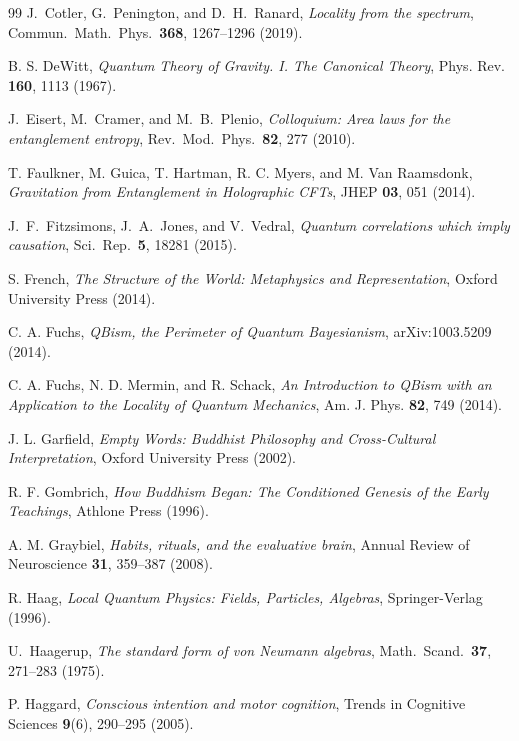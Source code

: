 \documentclass[12pt,a4paper,openany]{book}
\begin{document}
\begin{thebibliography}{99}
J.~Cotler, G.~Penington, and D.~H.~Ranard,
\emph{Locality from the spectrum},
Commun.\ Math.\ Phys.\ \textbf{368}, 1267--1296 (2019).

B. S. DeWitt, \emph{Quantum Theory of Gravity. I. The Canonical Theory}, Phys. Rev. \textbf{160}, 1113 (1967).

J.~Eisert, M.~Cramer, and M.~B.~Plenio,
\emph{Colloquium: Area laws for the entanglement entropy},
Rev.\ Mod.\ Phys.\ \textbf{82}, 277 (2010).

T. Faulkner, M. Guica, T. Hartman, R. C. Myers, and M. Van Raamsdonk, \emph{Gravitation from Entanglement in Holographic CFTs}, JHEP \textbf{03}, 051 (2014).

J.~F.~Fitzsimons, J.~A.~Jones, and V.~Vedral,
\emph{Quantum correlations which imply causation},
Sci.\ Rep.\ \textbf{5}, 18281 (2015).

S. French, \emph{The Structure of the World: Metaphysics and Representation}, Oxford University Press (2014).


C. A. Fuchs, \emph{QBism, the Perimeter of Quantum Bayesianism}, arXiv:1003.5209 (2014).

C. A. Fuchs, N. D. Mermin, and R. Schack, \emph{An Introduction to QBism with an Application to the Locality of Quantum Mechanics}, Am. J. Phys. \textbf{82}, 749 (2014).

J. L. Garfield, \emph{Empty Words: Buddhist Philosophy and Cross-Cultural Interpretation}, Oxford University Press (2002).

R. F. Gombrich, \emph{How Buddhism Began: The Conditioned Genesis of the Early Teachings}, Athlone Press (1996).

A. M. Graybiel, \emph{Habits, rituals, and the evaluative brain}, Annual Review of Neuroscience \textbf{31}, 359--387 (2008).

R. Haag, \emph{Local Quantum Physics: Fields, Particles, Algebras}, Springer-Verlag (1996).

U.~Haagerup,
\emph{The standard form of von Neumann algebras},
Math.\ Scand.\ \textbf{37}, 271--283 (1975).

P. Haggard, \emph{Conscious intention and motor cognition}, Trends in Cognitive Sciences \textbf{9}(6), 290--295 (2005).


\end{thebibliography}
\end{document}
